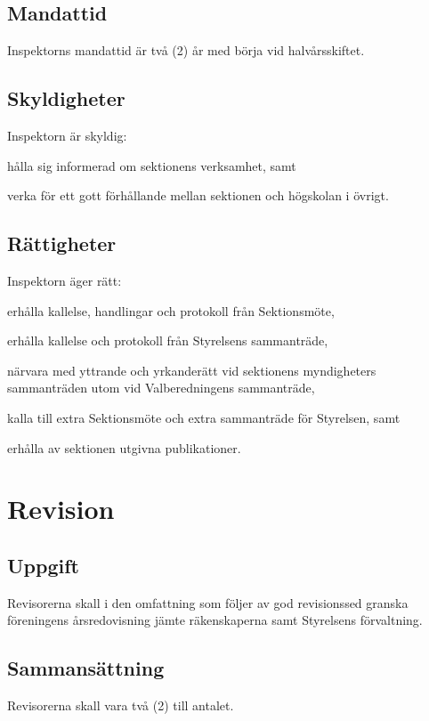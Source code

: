 \documentclass[10pt]{article}
\begin{document}
    \subsection{Mandattid}
    Inspektorns mandattid är två (2) år med börja vid halvårsskiftet.
    
    \subsection{Skyldigheter}
    Inspektorn är skyldig:
    \begin{attlist}
    \item hålla sig informerad om sektionens verksamhet, samt
    \item verka för ett gott förhållande mellan sektionen och högskolan i övrigt.
    \end{attlist}
    
    \subsection{Rättigheter}
    Inspektorn äger rätt:
    \begin{attlist}
    \item  	erhålla kallelse, handlingar och protokoll från Sektionsmöte,
    \item 	erhålla kallelse och protokoll från Styrelsens sammanträde,
    \item 	närvara med yttrande och yrkanderätt vid sektionens myndigheters
        sammanträden utom vid Valberedningens sammanträde,
    \item  	kalla till extra Sektionsmöte och extra sammanträde för Styrelsen, samt
    \item  	erhålla av sektionen utgivna publikationer.
    \end{attlist}
    \newpage
    
    \section{Revision}
    \subsection{Uppgift}
    Revisorerna skall i den omfattning som följer av god revisionssed granska
    föreningens årsredovisning jämte räkenskaperna samt Styrelsens förvaltning.
    
    \subsection{Sammansättning}
    Revisorerna skall vara två (2) till antalet.
    
\end{document}
